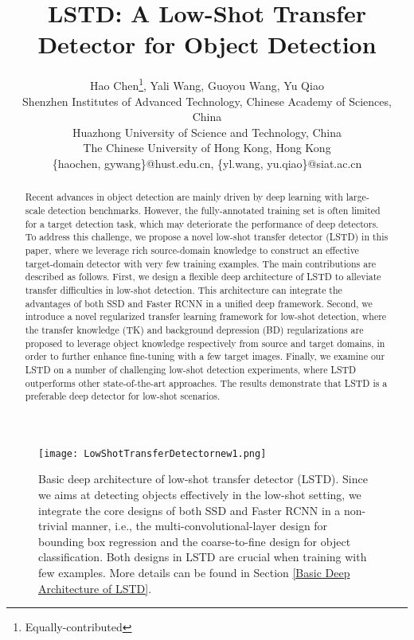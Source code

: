 \documentclass[letterpaper]{article} \usepackage{aaai18}  \usepackage{times}  \usepackage{helvet}  \usepackage{courier}  \usepackage{url}  \usepackage{graphicx}
\begin{document}
\title{LSTD: A Low-Shot Transfer Detector for Object Detection}
\author{Hao Chen\thanks{Equally-contributed}, Yali Wang, Guoyou Wang, Yu Qiao\\

Shenzhen Institutes of Advanced Technology, Chinese Academy of Sciences, China\\
Huazhong University of Science and Technology, China\\
The Chinese University of Hong Kong, Hong Kong\\
\{haochen, gywang\}@hust.edu.cn, \{yl.wang, yu.qiao\}@siat.ac.cn\\}
\maketitle


\begin{abstract}
Recent advances in object detection are mainly driven by deep learning with large-scale detection benchmarks.
However,
the fully-annotated training set is often limited for a target detection task,
which may deteriorate the performance of deep detectors.
To address this challenge,
we propose a novel low-shot transfer detector (LSTD) in this paper,
where we leverage rich source-domain knowledge to construct an effective target-domain detector with very few training examples.
The main contributions are described as follows.
First,
we design a flexible deep architecture of LSTD to alleviate transfer difficulties in low-shot detection.
This architecture can integrate the advantages of both SSD and Faster RCNN in a unified deep framework.
Second,
we introduce a novel regularized transfer learning framework for low-shot detection,
where
the transfer knowledge (TK) and background depression (BD) regularizations are proposed to leverage object knowledge respectively from source and target domains,
in order to further enhance fine-tuning with a few target images.
Finally,
we examine our LSTD on a number of challenging low-shot detection experiments,
where
LSTD outperforms other state-of-the-art approaches.
The results demonstrate that LSTD is a preferable deep detector for low-shot scenarios.
\end{abstract}


\begin{figure*}[t]
\centering
\texttt{[image: LowShotTransferDetectornew1.png]}
\caption{Basic deep architecture of low-shot transfer detector (LSTD).
Since we aims at detecting objects effectively in the low-shot setting,
we integrate the core designs of both SSD \cite{Liueccv2016} and Faster RCNN \cite{Renpami2016} in a non-trivial manner,
i.e.,
the multi-convolutional-layer design for bounding box regression and the coarse-to-fine design for object classification.
Both designs in LSTD are crucial when training with few examples.
More details can be found in Section \ref{Basic Deep Architecture of LSTD}.}
\label{LSTD}
\end{figure*}
\end{document}
